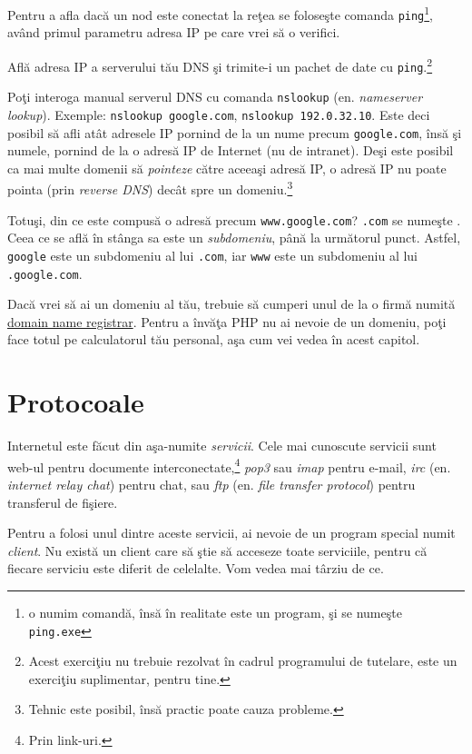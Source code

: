 Pentru a afla dacă un nod este conectat la reţea se foloseşte comanda
\texttt{ping}\footnote{o numim comandă, însă în realitate este un program,
şi se numeşte \texttt{ping.exe}}, având primul
parametru adresa IP pe care vrei să o verifici.

\begin{Exercise}[title={Ping your DNS server}]
Află adresa IP a serverului tău DNS şi trimite-i un pachet de date cu \texttt{ping}.\footnote{Acest exerciţiu nu trebuie
rezolvat în cadrul programului de tutelare, este un exerciţiu suplimentar,
pentru tine.}
\end{Exercise}

Poţi interoga manual serverul DNS cu comanda \texttt{nslookup}
(en. \textsl{nameserver lookup}). Exemple:
\texttt{nslookup google.com}, \texttt{nslookup 192.0.32.10}.
Este deci posibil să afli atât adresele IP pornind de la un nume precum
\texttt{google.com}, însă şi numele, pornind de la o adresă IP de Internet
(nu de intranet).
Deşi este posibil ca mai multe domenii să \textsl{pointeze} către aceeaşi
adresă IP, o adresă IP nu poate {\glqq}pointa{\grqq} (prin \textsl{reverse DNS})
decât spre un domeniu.\footnote{Tehnic este posibil, însă practic poate
cauza probleme.}

Totuşi, din ce este compusă o adresă precum \texttt{www.google.com}?
\texttt{.com} se numeşte . Ceea ce se află în stânga
sa este un \textsl{subdomeniu}, până la următorul punct.
Astfel, \texttt{google} este un subdomeniu al lui \texttt{.com},
iar \texttt{www} este un subdomeniu al lui \texttt{.google.com}.

Dacă vrei să ai un domeniu al tău, trebuie să cumperi unul de la
o firmă numită \href{http://en.wikipedia.org/wiki/Domain_name_registrar}{domain name
registrar}. Pentru a învăţa PHP nu ai nevoie de un domeniu, poţi
face totul pe calculatorul tău personal, aşa cum vei vedea în acest capitol.

\section{Protocoale}
Internetul este {\glqq}făcut{\grqq} din aşa-numite \textsl{servicii}. Cele mai cunoscute servicii sunt
web-ul pentru documente interconectate,\footnote{Prin link-uri.}
\textsl{pop3} sau \textsl{imap} pentru e-mail,
\textsl{irc} (en. \textsl{internet relay chat}) pentru chat, sau
\textsl{ftp} (en. \textsl{file transfer protocol}) pentru transferul de fişiere.

Pentru a folosi unul dintre aceste servicii, ai nevoie de un program
special numit \textsl{client}. Nu există un client care să {\glqq}ştie{\grqq} 
să acceseze toate serviciile, pentru
că fiecare serviciu este diferit de celelalte. Vom vedea mai târziu de ce.

